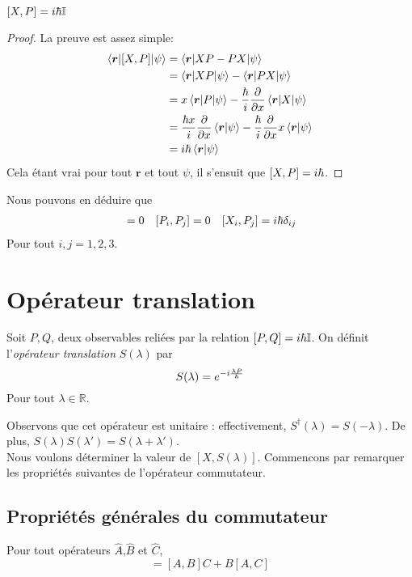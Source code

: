 \documentclass[../Notesdecours.tex]{subfiles}
\begin{document}
\begin{Property} $[X,P] = i\hbar\mathbb{I}$ \end{Property}
\begin{proof}
La preuve est assez simple:
\begin{align*}
	\braket{\bm{r}|[X,P]|\psi} &= \braket{\bm{r}|XP-PX|\psi}\\
	&= \braket{\bm{r}|XP|\psi} - \braket{\bm{r}|PX|\psi}\\
	&= x\braket{\bm{r}|P|\psi} -\frac{\hbar}{i}\frac{\partial}{\partial x}\braket{\bm{r}|X|\psi}\\
	&= \frac{\hbar x}{i}\frac{\partial}{\partial x}\braket{\bm{r}|\psi} - \frac{\hbar}{i} \frac{\partial}{\partial x}x\braket{\bm{r}|\psi}\\
	&= i\hbar \braket{\bm{r}|\psi}
\end{align*}
Cela étant vrai pour tout $\bm{r}$ et tout $\psi$, il s'ensuit que $[X,P] = i\hbar$.
\end{proof}
Nous pouvons en déduire que 
\begin{align}
[X_i,X_j] &= 0 & [P_i,P_j] &= 0 & [X_i,P_j] = i\h\delta_{ij}
\end{align}
Pour tout $i,j = 1,2,3$.

\section{Opérateur translation}
\begin{definition}
	Soit $P,Q$, deux observables reliées par la relation $[P,Q] = i\hbar\mathbb{I}$. On définit l'\emph{opérateur translation} $S(\lambda)$ par
	\begin{equation}
		S(\lambda) = e^{-i\frac{\lambda P}{\hbar}}
	\end{equation}
	Pour tout $\lambda\in\mathbb{R}$.
\end{definition}
Observons que cet opérateur est unitaire : effectivement, $S^\dagger (\lambda) = S(-\lambda)$. De plus, $S(\lambda)S(\lambda') = S(\lambda + \lambda')$.\\

Nous voulons déterminer la valeur de $[X,S(\lambda)]$. Commencons par remarquer les propriétés suivantes de l'opérateur commutateur.
\subsection{Propriétés générales du commutateur}
\begin{Property}
	Pour tout opérateurs $\hat{A}$,$\hat{B}$ et $\hat{C}$,
	\begin{equation}
		[A,BC] = [A,B]C + B[A,C]
	\end{equation}
\end{Property}
\end{document}
